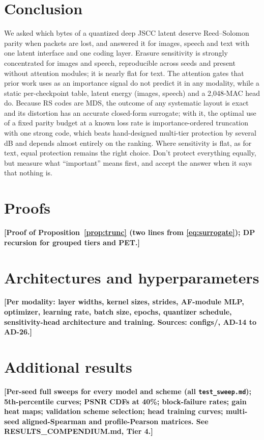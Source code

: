\documentclass[journal]{IEEEtran}
\providecommand{\TBD}[1]{\textbf{\color{red}[#1]}}
\begin{document}
\section{Conclusion}\label{sec:conclusion}
We asked which bytes of a quantized deep JSCC latent deserve Reed--Solomon parity when packets are lost,
and answered it for images, speech and text with one latent interface and one coding layer. Erasure
sensitivity is strongly concentrated for images and speech, reproducible across seeds and present
without attention modules; it is nearly flat for text. The attention gates that prior work uses as an
importance signal do not predict it in any modality, while a static per-checkpoint table, latent energy
(images, speech) and a 2,048-MAC head do. Because RS codes are MDS, the outcome of any systematic layout
is exact and its distortion has an accurate closed-form surrogate; with it, the optimal use of a fixed
parity budget at a known loss rate is importance-ordered truncation with one strong code, which beats
hand-designed multi-tier protection by several dB and depends almost entirely on the ranking. Where
sensitivity is flat, as for text, equal protection remains the right choice. Don't protect everything
equally, but measure what ``important'' means first, and accept the answer when it says that nothing is.

\appendices
\section{Proofs}
\TBD{Proof of Proposition~\ref{prop:trunc} (two lines from \eqref{eq:surrogate}); DP recursion for
grouped tiers and PET.}

\section{Architectures and hyperparameters}
\TBD{Per modality: layer widths, kernel sizes, strides, AF-module MLP, optimizer, learning rate, batch
size, epochs, quantizer schedule, sensitivity-head architecture and training. Sources: configs/, AD-14
to AD-26.}

\section{Additional results}
\TBD{Per-seed full sweeps for every model and scheme (all \texttt{test\_sweep.md}); 5th-percentile
curves; PSNR CDFs at 40\%; block-failure rates; gain heat maps; validation scheme selection; head
training curves; multi-seed aligned-Spearman and profile-Pearson matrices. See RESULTS\_COMPENDIUM.md,
Tier 4.}



\end{document}
